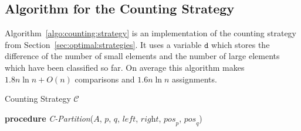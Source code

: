 \documentclass[prodmode,acmtalg]{acmsmall}
\begin{document}
            \subsection{Algorithm for the Counting Strategy}
            \label{app:sec:algo:counting:strategy}
            Algorithm~\ref{algo:counting:strategy} is an implementation
            of the counting strategy from Section~\ref{sec:optimal:strategies}. 
            It uses a variable $\texttt{d}$ which stores the difference of
            the number of small elements and the number of large elements
            which have been classified so far.  On average this algorithm makes
            $1.8 n \ln n + O(n)$ comparisons and $1.6 n \ln n$ assignments.
\begin{algorithm}
    \caption{Counting Strategy $\mathcal{C}$}\samepage\label{algo:counting:strategy}
    \textbf{procedure} \textit{C-Partition}($\textit{A}$,
		$\textit{p}$, $\textit{q}$, $\textit{left}$,
		$\textit{right}$, $\textit{pos}_{\textit{p}}$, $\textit{pos}_{\textit{q}}$)
\end{algorithm}
\end{document}
